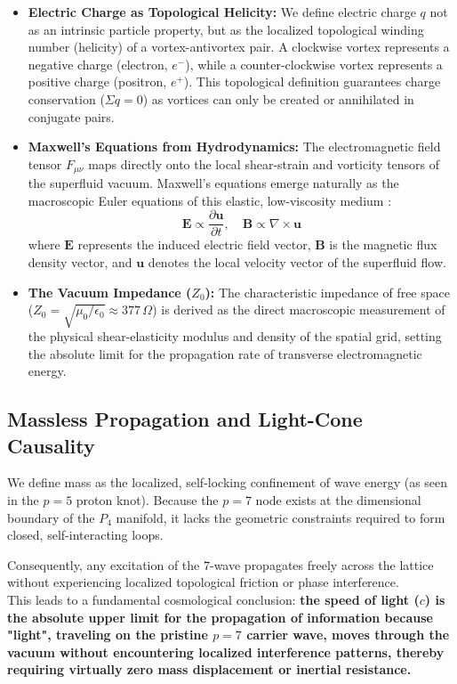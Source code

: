 \documentclass[twocolumn]{aa}
\begin{document}
\begin{itemize}
    \item \textbf{Electric Charge as Topological Helicity:} We define electric charge $q$ not as an intrinsic particle property, but as the localized topological winding number (helicity) of a vortex-antivortex pair. A clockwise vortex represents a negative charge (electron, $e^-$), while a counter-clockwise vortex represents a positive charge (positron, $e^+$). This topological definition guarantees charge conservation ($\Sigma q = 0$) as vortices can only be created or annihilated in conjugate pairs.
    
    \item \textbf{Maxwell's Equations from Hydrodynamics:} The electromagnetic field tensor $F_{\mu\nu}$ maps directly onto the local shear-strain and vorticity tensors of the superfluid vacuum. Maxwell’s equations emerge naturally as the macroscopic Euler equations of this elastic, low-viscosity medium \cite{volovik2003}:
    \begin{equation}
    \mathbf{E} \propto \frac{\partial \mathbf{u}}{\partial t}, \quad \mathbf{B} \propto \nabla \times \mathbf{u}
    \end{equation}
    where $\mathbf{E}$ represents the induced electric field vector, $\mathbf{B}$ is the magnetic flux density vector, and $\mathbf{u}$ denotes the local velocity vector of the superfluid flow.
    
    \item \textbf{The Vacuum Impedance ($Z_0$):} The characteristic impedance of free space ($Z_0 = \sqrt{\mu_0/\epsilon_0} \approx 377\,\Omega$) is derived as the direct macroscopic measurement of the physical shear-elasticity modulus and density of the spatial grid, setting the absolute limit for the propagation rate of transverse electromagnetic energy.
\end{itemize}

\subsection{Massless Propagation and Light-Cone Causality}
We define mass as the localized, self-locking confinement of wave energy (as seen in the $p=5$ proton knot). Because the $p=7$ node exists at the dimensional boundary of the $P_4$ manifold, it lacks the geometric constraints required to form closed, self-interacting loops. 

Consequently, any excitation of the $7$-wave propagates freely across the lattice without experiencing localized topological friction or phase interference. \\
This leads to a fundamental cosmological conclusion: \textbf{the speed of light ($c$) is the absolute upper limit for the propagation of information because "light", traveling on the pristine $p=7$ carrier wave, moves through the vacuum without encountering localized interference patterns, thereby requiring virtually zero mass displacement or inertial resistance.} 
\end{document}
